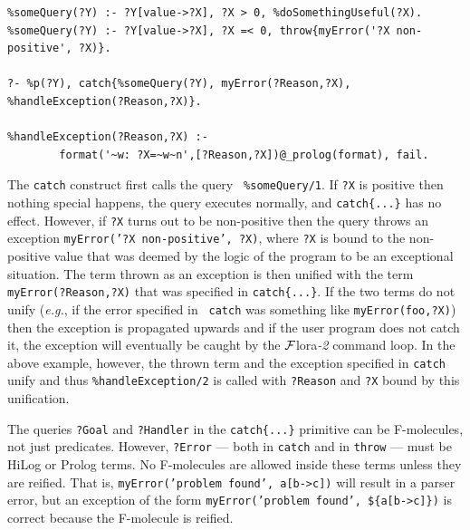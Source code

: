 \documentclass[11pt]{article}
\newcommand{\FLORA}{{\mbox{\sc ${\cal F}${lora}\rm\emph{-2}}}\xspace}
\begin{document}
\begin{verbatim}
%someQuery(?Y) :- ?Y[value->?X], ?X > 0, %doSomethingUseful(?X).  
%someQuery(?Y) :- ?Y[value->?X], ?X =< 0, throw{myError('?X non-positive', ?X)}.

?- %p(?Y), catch{%someQuery(?Y), myError(?Reason,?X), %handleException(?Reason,?X)}.

%handleException(?Reason,?X) :-
        format('~w: ?X=~w~n',[?Reason,?X])@_prolog(format), fail.
\end{verbatim}
The {\tt catch} construct first calls the query {\tt
  \verb|%|someQuery/1}. If {\tt ?X} is positive then nothing special
  happens, the query executes normally, and {\tt catch\{...\}} has no
  effect.  However, if {\tt ?X} turns out to be non-positive then the
  query throws an exception {\tt myError('?X {\tt non-positive', ?X)}},
  where {\tt ?X} is bound to the non-positive value that was deemed by
  the logic of the program to be an exceptional situation.  The term
  thrown as an exception is then unified with the term {\tt
  myError(?Reason,?X)} that was specified in {\tt catch\{...\}}. If the
  two terms do not unify ({\it e.g.}, if the error specified in {\tt
  catch} was something like {\tt myError(foo,?X)}) then the exception is
  propagated upwards and if the user program does not catch it, the
  exception will eventually be caught by the \FLORA command loop. In the
  above example,
  however, the thrown term and the exception specified in
  {\tt catch} unify and thus {\tt \verb|%|handleException/2} is called
  with {\tt ?Reason} and {\tt ?X} bound by this unification.

The queries {\tt ?Goal} and {\tt ?Handler} in the {\tt catch\{...\}}
primitive can be F-molecules, not just predicates. However, {\tt ?Error}
--- both in {\tt catch} and in {\tt throw} --- must be HiLog or Prolog
terms.  No F-molecules are allowed inside these terms unless they are
reified. That is, {\tt myError('problem found', a[b->c])} will result in a
parser error, but an exception of the form {\tt myError('problem found',
  \$\{a[b->c]\})} is correct because the F-molecule is reified.
\end{document}
